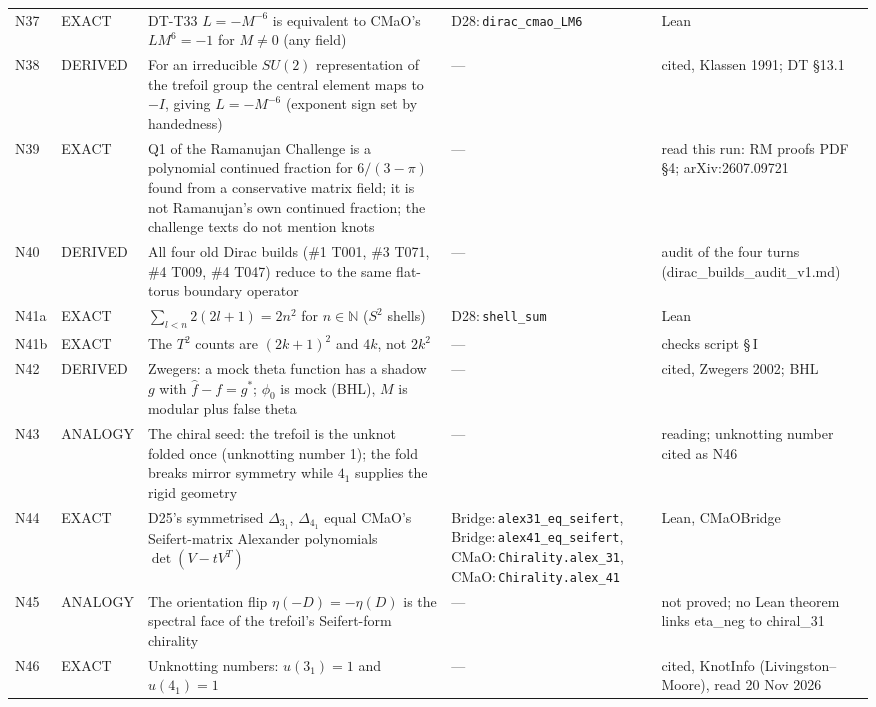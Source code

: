 \documentclass[11pt]{article}
\theoremstyle{definition}
\newcommand{\lean}[1]{\texttt{\small #1}}
\begin{document}
{\begin{longtable}{@{}L{0.05\textwidth}L{0.12\textwidth}L{0.26\textwidth}L{0.27\textwidth}L{0.17\textwidth}@{}}
N37 & EXACT & DT-T33 $L=-M^{-6}$ is equivalent to CMaO's $LM^6=-1$ for $M\neq0$ (any field) & D28:\,\lean{dirac\_\allowbreak{}cmao\_\allowbreak{}LM6} & Lean\\
N38 & DERIVED & For an irreducible $SU(2)$ representation of the trefoil group the central element maps to $-I$, giving $L=-M^{-6}$ (exponent sign set by handedness) & --- & cited, Klassen 1991; DT \S13.1\\
N39 & EXACT & Q1 of the Ramanujan Challenge is a polynomial continued fraction for $6/(3-\pi)$ found from a conservative matrix field; it is not Ramanujan's own continued fraction; the challenge texts do not mention knots & --- & read this run: RM proofs PDF \S4; arXiv:2607.09721\\
N40 & DERIVED & All four old Dirac builds (\#1 T001, \#3 T071, \#4 T009, \#4 T047) reduce to the same flat-torus boundary operator & --- & audit of the four turns (dirac\_\allowbreak{}builds\_\allowbreak{}audit\_\allowbreak{}v1.md)\\
N41a & EXACT & $\sum_{l<n}2(2l+1)=2n^2$ for $n\in\mathbb N$ ($S^2$ shells) & D28:\,\lean{shell\_\allowbreak{}sum} & Lean\\
N41b & EXACT & The $T^2$ counts are $(2k+1)^2$ and $4k$, not $2k^2$ & --- & checks script \S\,I\\
N42 & DERIVED & Zwegers: a mock theta function has a shadow $g$ with $\hat f-f=g^*$; $\phi_0$ is mock (BHL), $M$ is modular plus false theta & --- & cited, Zwegers 2002; BHL\\
N43 & ANALOGY & The chiral seed: the trefoil is the unknot folded once (unknotting number 1); the fold breaks mirror symmetry while $4_1$ supplies the rigid geometry & --- & reading; unknotting number cited as N46\\
N44 & EXACT & D25's symmetrised $\Delta_{3_1}$, $\Delta_{4_1}$ equal CMaO's Seifert-matrix Alexander polynomials $\det(V-tV^T)$ & Bridge:\,\lean{alex31\_\allowbreak{}eq\_\allowbreak{}seifert}, Bridge:\,\lean{alex41\_\allowbreak{}eq\_\allowbreak{}seifert}, CMaO:\,\lean{Chirality.\allowbreak{}alex\_\allowbreak{}31}, CMaO:\,\lean{Chirality.\allowbreak{}alex\_\allowbreak{}41} & Lean, CMaOBridge\\
N45 & ANALOGY & The orientation flip $\eta(-D)=-\eta(D)$ is the spectral face of the trefoil's Seifert-form chirality & --- & not proved; no Lean theorem links eta\_\allowbreak{}neg to chiral\_\allowbreak{}31\\
N46 & EXACT & Unknotting numbers: $u(3_1)=1$ and $u(4_1)=1$ & --- & cited, KnotInfo (Livingston--Moore), read 20 Nov 2026\\

\end{longtable}}
\end{document}
